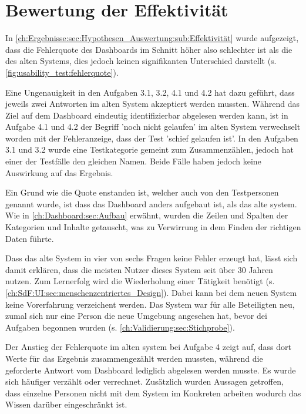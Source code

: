 \section{Bewertung der Effektivität}
\label{ch:Diskussion:Effektivität}

In \autoref{ch:Ergebnisse:sec:Hypothesen_Auswertung:sub:Effektivität} wurde aufgezeigt, dass die Fehlerquote des Dashboards im Schnitt höher also schlechter ist als die des alten Systems, dies jedoch keinen signifikanten Unterschied darstellt (s. \autoref{fig:usability_test:fehlerquote}).

Eine Ungenauigkeit in den Aufgaben 3.1, 3.2, 4.1 und 4.2 hat dazu geführt, dass jeweils zwei Antworten im alten System akzeptiert werden mussten. Während das Ziel auf dem Dashboard eindeutig identifizierbar abgelesen werden kann, ist in Aufgabe 4.1 und 4.2 der Begriff 'noch nicht gelaufen' im alten System verwechselt worden mit der Fehleranzeige, dass der Test 'schief gelaufen ist'. In den Aufgaben 3.1 und 3.2 wurde eine Testkategorie gemeint zum Zusammenzählen, jedoch hat einer der Testfälle den gleichen Namen. Beide Fälle haben jedoch keine Auswirkung auf das Ergebnis.

Ein Grund wie die Quote enstanden ist, welcher auch von den Testpersonen genannt wurde, ist dass das Dashboard anders aufgebaut ist, als das alte system. Wie in \autoref{ch:Dashboard:sec:Aufbau} erwähnt, wurden die Zeilen und Spalten der Kategorien und Inhalte getauscht, was zu Verwirrung in dem Finden der richtigen Daten führte.

Dass das alte System in vier von sechs Fragen keine Fehler erzeugt hat, lässt sich damit erklären, dass die meisten Nutzer dieses System seit über 30 Jahren nutzen. Zum Lernerfolg wird die Wiederholung einer Tätigkeit benötigt (s. \autoref{ch:SdF:UI:sec:menschenzentriertes_Design}). Dabei kann bei dem neuen System keine Vorerfahrung verzeichent werden. Das System war für alle Beteiligten neu, zumal sich nur eine Person die neue Umgebung angesehen hat, bevor dei Aufgaben begonnen wurden (s. \autoref{ch:Validierung:sec:Stichprobe}).

Der Anstieg der Fehlerquote im alten system bei Aufgabe 4 zeigt auf, dass dort Werte für das Ergebnis zusammengezählt werden mussten, während die geforderte Antwort vom Dashboard lediglich abgelesen werden musste. Es wurde sich häufiger verzählt oder verrechnet. Zusätzlich wurden Aussagen getroffen, dass einzelne Personen nicht mit dem System im Konkreten arbeiten wodurch das Wissen darüber eingeschränkt ist.

